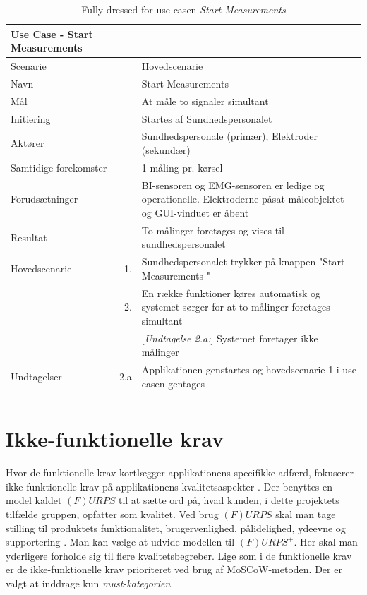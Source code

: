 \begin{longtabu} to  %
	{\large \textbf{Use Case - Start Measurements }} && \\
	\toprule
	Scenarie 				&&	Hovedscenarie\\
	Navn 					&& 	Start Measurements\\
	Mål 					&& 	At måle to signaler simultant \\
	Initiering 				&& 	Startes af Sundhedspersonalet\\
	Aktører 				&& 	Sundhedspersonale (primær), Elektroder (sekundær)\\
	
	Samtidige forekomster  	&& 	1 måling pr. kørsel \\
	Forudsætninger 			&&	BI-sensoren og EMG-sensoren er ledige og operationelle. Elektroderne påsat måleobjektet og GUI-vinduet er åbent \\ 
	Resultat 				&& 	To målinger foretages og vises til sundhedspersonalet\\ \midrule
	Hovedscenarie 			&    1. 	&	Sundhedspersonalet trykker på knappen "Start Measurements "\\				 	
							&    2. 	& 	En række funktioner køres automatisk og systemet sørger for at to målinger foretages simultant\\
	
	
	&&[\textit{Undtagelse 2.a:}] Systemet foretager ikke målinger\\ \midrule						
							
							
	Undtagelser 			&		2.a	& 	Applikationen genstartes og hovedscenarie 1 i use casen gentages \\ \bottomrule
	
	\caption{Fully dressed for use casen \textit{Start Measurements}}
	\label{UC1}
\end{longtabu}

\pagebreak
\section{Ikke-funktionelle krav}

Hvor de funktionelle krav kortlægger applikationens specifikke adfærd, fokuserer ikke-funktionelle krav på applikationens kvalitetsaspekter \cite{ISELektioner}.
Der benyttes en model kaldet $(F)URPS$ til at sætte ord på, hvad kunden, i dette projektets tilfælde gruppen, opfatter som kvalitet. Ved brug $(F)URPS$ skal man tage stilling til produktets funktionalitet, brugervenlighed, pålidelighed, ydeevne og supportering \cite{ISELektioner}. Man kan vælge at udvide  modellen til  $(F)URPS^{+}$. Her skal man yderligere forholde sig til flere kvalitetsbegreber. Lige som i de funktionelle krav er de ikke-funktionelle krav prioriteret ved brug af MoSCoW-metoden. Der er valgt at inddrage kun \textit{must-kategorien}. 

